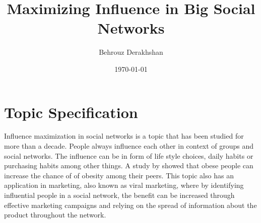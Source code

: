 \documentclass[english]{tktltiki}
\begin{document}
\onehalfspacing

\title{Maximizing Influence in Big Social Networks}
\author{Behrouz Derakhshan}
\date{\today}

\maketitle


\section{Topic Specification}
Influence maximization in social networks is a topic that has been studied for more than a decade. People always influence each other in context of groups and social networks. The influence can be in form of life style choices, daily habits or purchasing habits among other things. A study by \cite{christ07} showed that obese people can increase the chance of of obesity among their peers. This topic also has an application in marketing, also known as viral marketing,  where by identifying influential people in a social network, the benefit can be increased through effective marketing campaigns and relying on the spread of information about the product throughout the network. 
\end{document}
